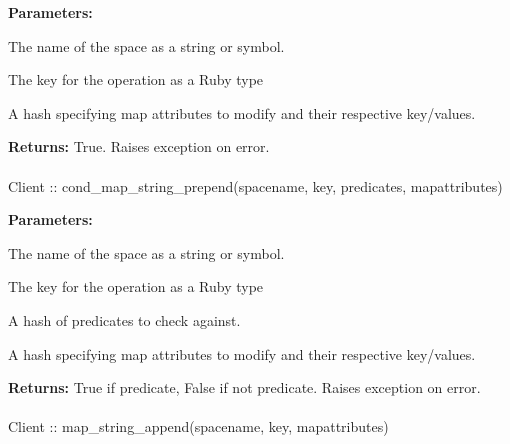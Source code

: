 \noindent\textbf{Parameters:}
\begin{description}[labelindent=\widthof{{\code{mapattributes}}},leftmargin=*,noitemsep,nolistsep,align=right]
\item[\code{spacename}] The name of the space as a string or symbol.
\item[\code{key}] The key for the operation as a Ruby type
\item[\code{mapattributes}] A hash specifying map attributes to modify and their respective key/values.
\end{description}

\noindent\textbf{Returns:}
True.  Raises exception on error.

\paragraph{}
\label{api:ruby:cond_map_string_prepend}
\begin{ccode}
Client :: cond_map_string_prepend(spacename, key, predicates, mapattributes)
\end{ccode}
\funcdesc 

\noindent\textbf{Parameters:}
\begin{description}[labelindent=\widthof{{\code{mapattributes}}},leftmargin=*,noitemsep,nolistsep,align=right]
\item[\code{spacename}] The name of the space as a string or symbol.
\item[\code{key}] The key for the operation as a Ruby type
\item[\code{predicates}] A hash of predicates to check against.
\item[\code{mapattributes}] A hash specifying map attributes to modify and their respective key/values.
\end{description}

\noindent\textbf{Returns:}
True if predicate, False if not predicate.  Raises exception on error.

\paragraph{}
\label{api:ruby:map_string_append}
\begin{ccode}
Client :: map_string_append(spacename, key, mapattributes)
\end{ccode}
\funcdesc 

